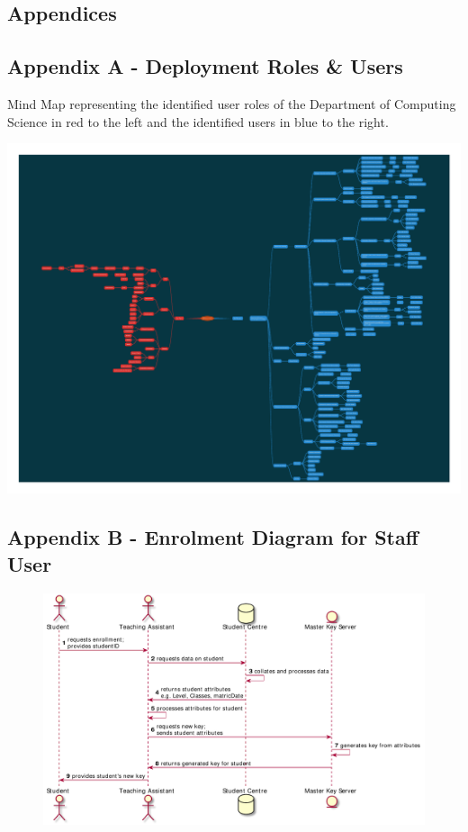 \begin{appendices}

\chapter{Appendices}
\label{ch:appendices}

\section{Appendix A - Deployment Roles \& Users}
\label{appendix:roles_users}

Mind Map representing the identified user roles of the Department of Computing Science in red to the left and the identified users in blue to the right.

\includegraphics[width=\linewidth]{appendices/mind_maps/ABE_Users_slides_Oct26.pdf}

\section{Appendix B - Enrolment Diagram for Staff User}
\label{appendix:enrolment_diagram}

\begin{figure}
    \centering
    \includegraphics[width=\linewidth,keepaspectratio]{appendices/diagrams/flow_of_info/enrollment_stu_sequence.pdf}


\end{figure}
\end{appendices}
